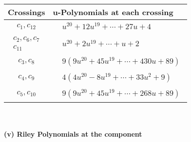 \documentclass[1p]{elsarticle_modified}
\theoremstyle{definition}
\begin{document}
\begin{tabular}{m{50pt}|m{274pt}}
Crossings & \hspace{64pt}u-Polynomials at each crossing \\
\hline $$\begin{aligned}c_{1},c_{12}\end{aligned}$$&$\begin{aligned}
&u^{20}+12 u^{19}+\cdots+27 u+4
\end{aligned}$\\
\hline $$\begin{aligned}c_{2},c_{6},c_{7}\\c_{11}\end{aligned}$$&$\begin{aligned}
&u^{20}+2 u^{19}+\cdots+u+2
\end{aligned}$\\
\hline $$\begin{aligned}c_{3},c_{8}\end{aligned}$$&$\begin{aligned}
&9(9 u^{20}+45 u^{19}+\cdots+430 u+89)
\end{aligned}$\\
\hline $$\begin{aligned}c_{4},c_{9}\end{aligned}$$&$\begin{aligned}
&4(4 u^{20}-8 u^{19}+\cdots+33 u^2+9)
\end{aligned}$\\
\hline $$\begin{aligned}c_{5},c_{10}\end{aligned}$$&$\begin{aligned}
&9(9 u^{20}+45 u^{19}+\cdots+268 u+89)
\end{aligned}$\\
\hline
\end{tabular}\\~\\
\newpage\renewcommand{\arraystretch}{1}
\flushleft \textbf{(v) Riley Polynomials at the component}\newline \\
\end{document}
